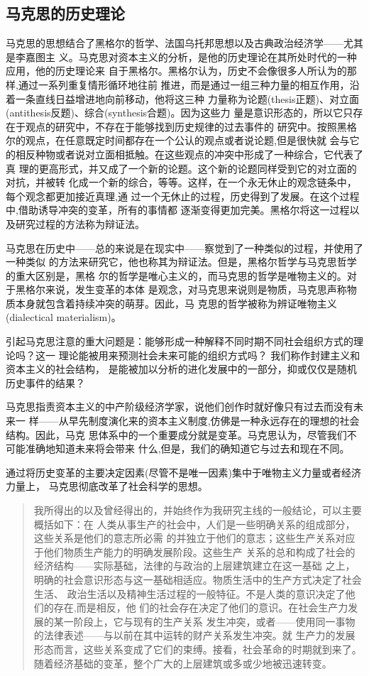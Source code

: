 \subsection{马克思的历史理论}

马克思的思想结合了黑格尔的哲学、法国乌托邦思想以及古典政治经济学——尤其是李嘉图主
义。马克思对资本主义的分析，是他的历史理论在其所处时代的一种应用，他的历史理论来
自于黑格尔。黑格尔认为，历史不会像很多人所认为的那样,通过一系列重复情形循环地往前
推进，而是通过一组三种力量的相互作用，沿着一条直线日益增进地向前移动，他将这三种
力量称为论题(thesis正题)、对立面(antithesis反题)、综合(synthesis合题)。因为这些力
量是意识形态的，所以它只存在于观点的研究中，不存在于能够找到历史规律的过去事件的
研究中。按照黑格尔的观点，在任意既定时间都存在一个公认的观点或者说论题,但是很快就
会与它的相反种物或者说对立面相抵触。在这些观点的冲突中形成了一种综合，它代表了真
理的更高形式，并又成了一个新的论题。这个新的论题同样受到它的对立面的对抗，并被转
化成一个新的综合，等等。这样，在一个永无休止的观念链条中，每个观念都更加接近真理,通
过一个无休止的过程，历史得到了发展。在这个过程中,借助诱导冲突的变革，所有的事情都
逐渐变得更加完美。黑格尔将这一过程以及研究过程的方法称为辩证法。

马克思在历史中——总的来说是在现实中——察觉到了一种类似的过程，并使用了一种类似
的方法来研究它，他也称其为辩证法。但是，黑格尔哲学与马克思哲学的重大区别是，黑格
尔的哲学是唯心主义的，而马克思的哲学是唯物主义的。对于黑格尔来说，发生变革的本体
是观念，对马克思来说则是物质，马克思声称物质本身就包含着持续冲突的萌芽。因此，马
克思的哲学被称为辨证唯物主义(dialectical materialism)。

引起马克思注意的重大问题是：能够形成一种解释不同时期不同社会组织方式的理论吗？这一
理论能被用来预测社会未来可能的组织方式吗？ 我们称作封建主义和资本主义的社会结构，
是能被加以分析的进化发展中的一部分，抑或仅仅是随机历史事件的结果？

马克思指责资本主义的中产阶级经济学家，说他们创作时就好像只有过去而没有未来一
样——从早先制度演化来的资本主义制度,仿佛是一种永远存在的理想的社会结构。因此，马克
思体系中的一个重要成分就是变革。马克思认为，尽管我们不可能准确地知道未来将会带来
什么,但是，我们的确知道它与过去和现在不同。

通过将历史变革的主要决定因素(尽管不是唯一因素)集中于唯物主义力量或者经济力量上，
马克思彻底改革了社会科学的思想。

\begin{quotation}
  我所得出的以及曾经得出的，并始终作为我研究主线的一般结论，可以主要概括如下：在
  人类从事生产的社会中，人们是一些明确关系的组成部分，这些关系是他们的意志所必需
  的并独立于他们的意志；这些生产关系对应于他们物质生产能力的明确发展阶段。这些生产
  关系的总和构成了社会的经济结构——实际基础，法律的与政治的上层建筑建立在这一基础
  之上，明确的社会意识形态与这一基础相适应。物质生活中的生产方式决定了社会生活、
  政治生活以及精神生活过程的一般特征。不是人类的意识决定了他们的存在,而是相反，他
  们的社会存在决定了他们的意识。在社会生产力发展的某一阶段上，它与现有的生产关系
  发生冲突，或者——使用同一事物的法律表述——与以前在其中运转的财产关系发生冲突。就
  生产力的发展形态而言，这些关系变成了它们的束缚。接看，社会革命的时期就到来了。
  随着经济基础的变革，整个广大的上层建筑或多或少地被迅速转变。
\end{quotation}

